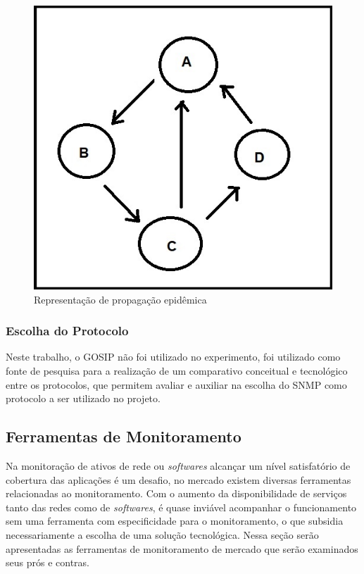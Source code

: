 \begin{figure}[H]
	\begin{center}
	\includegraphics[scale = 0.70]{img/gosip.jpg}
		\caption{Representação de propagação epidêmica   }
		\label{fun:fig:gosip}
	\end{center}
\end{figure}

\subsubsection{Escolha do Protocolo}

Neste trabalho, o \acrshort{GOSIP} não foi utilizado no experimento, foi utilizado como fonte de pesquisa para a realização de um comparativo conceitual e  tecnológico entre os protocolos, que permitem avaliar e auxiliar na escolha do \acrshort{SNMP} como protocolo a ser utilizado no projeto. 


\subsection{Ferramentas de Monitoramento}

Na monitoração de ativos de rede ou \textit{softwares} alcançar um nível satisfatório de cobertura das aplicações é um desafio, no mercado existem diversas ferramentas relacionadas ao monitoramento. Com o aumento da disponibilidade de serviços tanto das redes como de \textit{softwares}, é quase inviável acompanhar o funcionamento sem uma ferramenta com especificidade para o monitoramento, o que subsidia necessariamente a escolha de uma solução tecnológica. Nessa seção serão apresentadas as ferramentas de monitoramento de mercado que serão examinados seus prós e contras.

